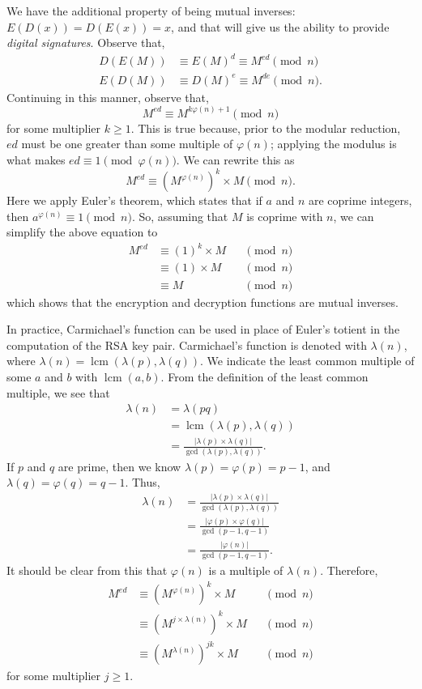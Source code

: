 We have the additional property of being mutual inverses:
$E(D(x)) = D(E(x)) = x$,
and that will give us the ability to provide \emph{digital signatures}.
Observe that,
\begin{align*}
        D(E(M)) &\equiv E(M)^d \equiv M^{e d} \pmod{n} \\
        E(D(M)) &\equiv D(M)^e \equiv M^{d e} \pmod{n}.
\end{align*}
Continuing in this manner, observe that,
\[
  M^{e d} \equiv M^{k \varphi(n) + 1} \pmod{n}
\]
for some multiplier $k \ge 1$. This is true because, prior to the
modular reduction, $ed$ must be one greater than some multiple of
$\varphi(n)$; applying the modulus is what makes
$e d \equiv 1 \pmod{\varphi(n)}$. We can rewrite this as
\[
  M^{e d} \equiv (M^{\varphi(n)})^k \times M \pmod{n}.
\]
Here we apply Euler's theorem, which states that if $a$ and $n$ are
coprime integers, then $a^{\varphi(n)} \equiv 1 \pmod{n}$. So, assuming
that $M$ is coprime with $n$, we can simplify the above equation to
\begin{align*}
  M^{e d} &\equiv (1)^k \times M  &&\pmod{n} \\
          &\equiv (1) \times M  &&\pmod{n} \\
          &\equiv M  &&\pmod{n}
\end{align*}
which shows that the encryption and decryption functions are
mutual inverses.

In practice, Carmichael's function can be used in place of Euler's totient in
the computation of the RSA key pair. Carmichael's function is denoted with
$\lambda(n)$, where $\lambda(n) = \operatorname{lcm}(\lambda(p), \lambda(q))$.
We indicate the least common multiple of some $a$ and $b$ with
$\operatorname{lcm}(a, b)$. From the definition of the least common multiple, we
see that
\begin{align*}
  \lambda(n) &= \lambda(pq) \\
             &= \operatorname{lcm}(\lambda(p), \lambda(q)) \\
             &= \frac{|\lambda(p) \times \lambda(q)|}{\operatorname{gcd}(\lambda(p), \lambda(q))}.
\end{align*}
If $p$ and $q$ are prime, then we know
$\lambda(p) = \varphi(p) = p - 1$, and $\lambda(q) = \varphi(q) = q - 1$. Thus,
\begin{align*}
  \lambda(n) &= \frac{|\lambda(p) \times \lambda(q)|}{\operatorname{gcd}(\lambda(p), \lambda(q))} \\
             &= \frac{|\varphi(p) \times \varphi(q)|}{\operatorname{gcd}(p - 1, q - 1)} \\
             &= \frac{|\varphi(n)|}{\operatorname{gcd}(p - 1, q - 1)}.
\end{align*}
It should be clear from this that $\varphi(n)$ is a multiple of $\lambda(n)$.
Therefore,
\begin{align*}
  M^{e d} &\equiv (M^{\varphi(n)})^k \times M &&\pmod{n} \\
          &\equiv (M^{j \times \lambda(n)})^k \times M &&\pmod{n} \\
          &\equiv (M^{\lambda(n)})^{jk} \times M &&\pmod{n}
\end{align*}
for some multiplier $j \ge 1$.

